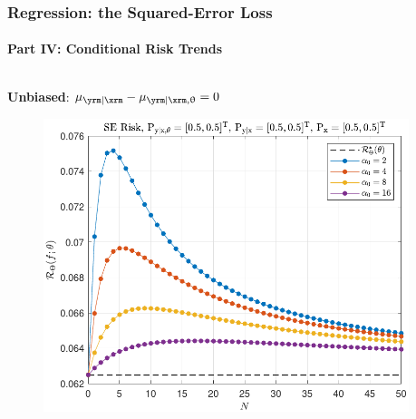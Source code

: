 \documentclass[aspectratio=169,usenames,dvipsnames]{beamer}
\begin{document}
\begin{frame}
\frametitle{Regression: the Squared-Error Loss}
\framesubtitle{Part IV: Conditional Risk Trends}

\begin{columns}[c]

\begin{column}{0.5\linewidth}

\centering
\textbf{Unbiased}: $\mu_{\yrm | \xrm} - \mu_{\yrm | \xrm,\uptheta} = 0$
%
\begin{figure}
\centering
\includegraphics[width=1\linewidth]{Risk_cond_SE_Dir_N_leg_a0_unbiased.pdf}
\end{figure}


\end{column}

\begin{column}{0.5\linewidth}


\end{column}
\end{columns}
\end{frame}
\end{document}
